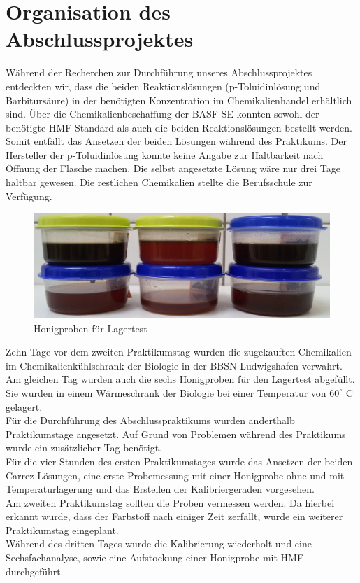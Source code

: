 \section{Organisation des Abschlussprojektes}
Während der Recherchen zur Durchführung unseres Abschlussprojektes entdeckten wir, dass die beiden Reaktionslösungen (p-Toluidinlösung und Barbitursäure) in der benötigten Konzentration im Chemikalienhandel erhältlich sind. Über die Chemikalienbeschaffung der BASF SE konnten sowohl der benötigte HMF-Standard als auch die beiden Reaktionslösungen bestellt werden. Somit entfällt das Ansetzen der beiden Lösungen während des Praktikums. Der Hersteller der p-Toluidinlösung konnte keine Angabe zur Haltbarkeit nach Öffnung der Flasche machen. Die selbst angesetzte Lösung wäre nur drei Tage haltbar gewesen. Die restlichen Chemikalien stellte die Berufsschule zur Verfügung.\\
\begin{figure}[tbp]
	\centering
		\includegraphics[width=1.00\textwidth]{../Bilder/20150504_141528.jpg}
	\caption{Honigproben für Lagertest}
	\label{fig:Lagertest}
\end{figure}
Zehn Tage vor dem zweiten Praktikumstag wurden die zugekauften Chemikalien im Chemikalienkühlschrank der Biologie in der BBSN Ludwigshafen verwahrt. Am gleichen Tag wurden auch die sechs Honigproben für den Lagertest abgefüllt. Sie wurden in einem Wärmeschrank der Biologie bei einer Temperatur von $60^\circ$ C gelagert.\\
Für die Durchführung des Abschlusspraktikums wurden anderthalb Praktikumstage angesetzt. Auf Grund von Problemen während des Praktikums wurde ein zusätzlicher Tag benötigt. \\
Für die vier Stunden des ersten Praktikumstages wurde das Ansetzen der beiden Carrez-Lösungen, eine erste Probemessung mit einer Honigprobe ohne und mit Temperaturlagerung und das Erstellen der Kalibriergeraden vorgesehen.\\
Am zweiten Praktikumstag sollten die Proben vermessen werden. Da hierbei erkannt wurde, dass der Farbstoff nach einiger Zeit zerfällt, wurde ein weiterer Praktikumstag eingeplant.\\
Während des dritten Tages wurde die Kalibrierung wiederholt und eine Sechsfachanalyse, sowie eine Aufstockung einer Honigprobe mit HMF durchgeführt.\\

